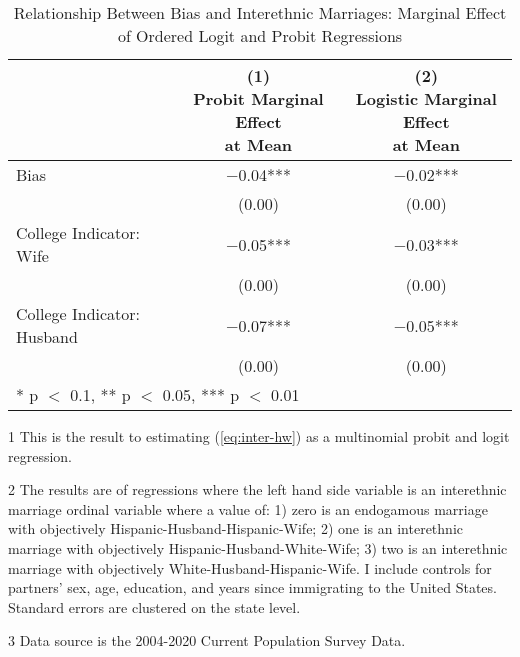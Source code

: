 \begin{table}[H]

\caption{Relationship Between Bias and Interethnic Marriages: Marginal Effect of Ordered Logit and Probit Regressions \label{regtab-logit-01}}
\centering
\begin{threeparttable}
\begin{tabular}[t]{lcc}
\toprule
  & \specialcell{(1) \\ Probit Marginal Effect \\ at Mean} & \specialcell{(2) \\ Logistic Marginal Effect \\ at Mean}\\
\midrule
Bias & \num{-0.04}*** & \num{-0.02}***\\
 & (\num{0.00}) & (\num{0.00})\\
College Indicator: Wife & \num{-0.05}*** & \num{-0.03}***\\
 & (\num{0.00}) & (\num{0.00})\\
College Indicator: Husband & \num{-0.07}*** & \num{-0.05}***\\
 & (\num{0.00}) & (\num{0.00})\\
\bottomrule
\multicolumn{3}{l}{\rule{0pt}{1em}* p $<$ 0.1, ** p $<$ 0.05, *** p $<$ 0.01}\\
\end{tabular}
\begin{tablenotes}
\small
\item[1] \footnotesize{This is the result to estimating (\ref{eq:inter-hw}) as a
                      multinomial probit and logit regression.}
\item[2] \footnotesize{The results are of regressions where the left hand side variable is 
                      an interethnic marriage ordinal variable where a value of: 1) zero is an endogamous marriage with
                      objectively Hispanic-Husband-Hispanic-Wife; 2) one is an interethnic marriage with
                      objectively Hispanic-Husband-White-Wife; 3) two is an interethnic marriage with
                      objectively White-Husband-Hispanic-Wife. I include controls for partners' sex, age, education, 
                      and years since immigrating to the United States.
                      Standard errors are clustered on the state level.}
\item[3] \footnotesize{Data source is the 2004-2020 Current Population Survey Data.}
\end{tablenotes}
\end{threeparttable}
\end{table}
